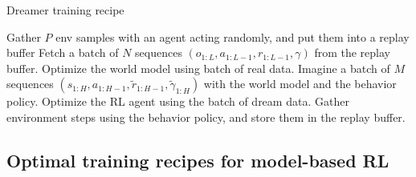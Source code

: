 \documentclass[twoside,11pt]{article}
\begin{document}
\begin{algorithm}
    \caption{Dreamer training recipe}
    \label{dreamer_loop}
    \begin{algorithmic}[1]
        \State Gather $P$ env samples with an agent acting randomly, and put them into a replay buffer
        \State Fetch a batch of $N$ sequences $(o_{1:L}, a_{1:L-1}, r_{1:L-1}, \gamma)$ from the replay buffer.
        \State Optimize the world model using batch of real data.
        \State Imagine a batch of $M$ sequences $(s_{1:H}, a_{1:H-1}, \widetilde{r}_{1:H-1}, \widetilde{\gamma}_{1:H})$ with the world model and the behavior policy.
        \State Optimize the RL agent using the batch of dream data.
        \State Gather environment steps using the behavior policy, and store them in the replay buffer.
        \EndWhile
    \end{algorithmic}
\end{algorithm}

\subsection{Optimal training recipes for model-based RL}


\vskip 0.2in

\end{document}
